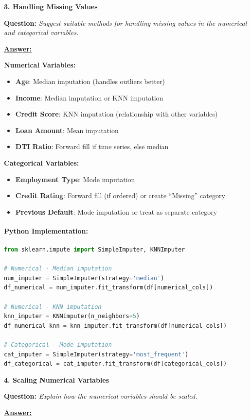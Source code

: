 \documentclass[11pt,a4paper]{article}
\newcommand{\questiontitle}[2]{%
    \vspace{0.4cm}%
    \noindent\textbf{\large\color{headerblue}#1. #2}\par\vspace{0.15cm}%
}
\newcommand{\qprompt}[1]{%
    \noindent\textbf{Question:} \textit{#1}\par\vspace{0.2cm}%
}
\newcommand{\answer}{\noindent\textbf{\underline{Answer:}}\par\vspace{0.15cm}}
\begin{document}
\vspace{0.35cm}

\questiontitle{3}{Handling Missing Values}
\qprompt{Suggest suitable methods for handling missing values in the numerical and categorical variables.}
\answer
\noindent\textbf{Numerical Variables:}
\begin{itemize}
    \item \textbf{Age}: Median imputation (handles outliers better)
    \item \textbf{Income}: Median imputation or KNN imputation
    \item \textbf{Credit Score}: KNN imputation (relationship with other variables)
    \item \textbf{Loan Amount}: Mean imputation
    \item \textbf{DTI Ratio}: Forward fill if time series, else median
\end{itemize}

\noindent\textbf{Categorical Variables:}
\begin{itemize}
    \item \textbf{Employment Type}: Mode imputation
    \item \textbf{Credit Rating}: Forward fill (if ordered) or create ``Missing'' category
    \item \textbf{Previous Default}: Mode imputation or treat as separate category
\end{itemize}

\paragraph{Python Implementation:}
\begin{lstlisting}[language=Python]
from sklearn.impute import SimpleImputer, KNNImputer

# Numerical - Median imputation
num_imputer = SimpleImputer(strategy='median')
df_numerical = num_imputer.fit_transform(df[numerical_cols])

# Numerical - KNN imputation
knn_imputer = KNNImputer(n_neighbors=5)
df_numerical_knn = knn_imputer.fit_transform(df[numerical_cols])

# Categorical - Mode imputation
cat_imputer = SimpleImputer(strategy='most_frequent')
df_categorical = cat_imputer.fit_transform(df[categorical_cols])
\end{lstlisting}

\vspace{0.35cm}

\questiontitle{4}{Scaling Numerical Variables}
\qprompt{Explain how the numerical variables should be scaled.}
\answer
\end{document}
